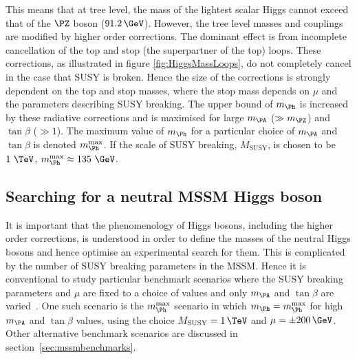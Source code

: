 This means that at tree level, the mass of the lightest scalar Higgs cannot
exceed that of the $\PZ$ boson ($91.2\,\GeV$). However, the tree level masses and
couplings are modified by higher order corrections. The dominant effect is from
incomplete cancellation of the top and stop (the superpartner of the top) loops.
These corrections, as illustrated in figure \ref{fig:HiggsMassLoops}, do not
completely cancel in the case that \ac{SUSY} is broken. Hence the size of the
corrections is strongly dependent on the top and stop masses, where the stop
mass depends on $\mu$ and the parameters describing \ac{SUSY} breaking. The upper
bound of $m_{\Ph}$ is increased by these radiative corrections and is maximised
for large $m_{\PA}$ ($\gg m_{\PZ}$) and $\tan\beta$ ($\gg1$). The maximum value of
$m_{\Ph}$ for a particular choice of $m_{\PA}$ and $\tan\beta$ is denoted
$m_{\Ph}^{\text{max}}$. If the scale of SUSY breaking, $M_{\text{SUSY}}$, is
chosen to be $1~\TeV$, $m_{\Ph}^{\text{max}} \approx 135~\GeV$.

\subsection{Searching for a neutral MSSM Higgs boson}
\label{sec:LHCMSSMHiggs}

It is important that the phenomenology of Higgs bosons, including the higher
order corrections, is understood in order to define the masses of the neutral
Higgs bosons and hence optimise an experimental search for them. This is
complicated by the number of \ac{SUSY} breaking parameters in the \ac{MSSM}. Hence it
is conventional to study particular benchmark scenarios where the \ac{SUSY} breaking
parameters and $\mu$ are fixed to a choice of values and only $m_{\PA}$ and
$\tan\beta$ are varied~\cite{Carena:2002es}. One such scenario is the $m_{\Ph}^{\text{max}}$ scenario
in which $m_{\Ph}=m_{\Ph}^{\text{max}}$ for high $m_{\PA}$ and $\tan\beta$
values, using the choice $M_{\text{SUSY}} = 1\,\TeV$ and $\mu = \pm 200\,\GeV$.
Other alternative benchmark scenarios are discussed in 
section~\ref{sec:mssmbenchmarks}. 

